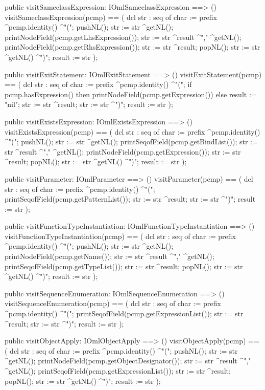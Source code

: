 \begin{vdm_al}
  public visitSameclassExpression: IOmlSameclassExpression ==> ()
  visitSameclassExpression(pcmp) ==
    ( dcl str : seq of char := prefix ^pcmp.identity() ^"(";
      pushNL();
      str := str ^getNL();
      printNodeField(pcmp.getLhsExpression());
      str := str ^result ^"," ^getNL();
      printNodeField(pcmp.getRhsExpression());
      str := str ^result;
      popNL();
      str := str ^getNL() ^")";
      result := str );

  public visitExitStatement: IOmlExitStatement ==> ()
  visitExitStatement(pcmp) ==
    ( dcl str : seq of char := prefix ^pcmp.identity() ^"(";
      if pcmp.hasExpression()
      then printNodeField(pcmp.getExpression())
      else result := "nil";
      str := str ^result;
      str := str ^")";
      result := str );

  public visitExistsExpression: IOmlExistsExpression ==> ()
  visitExistsExpression(pcmp) ==
    ( dcl str : seq of char := prefix ^pcmp.identity() ^"(";
      pushNL();
      str := str ^getNL();
      printSeqofField(pcmp.getBindList());
      str := str ^result ^"," ^getNL();
      printNodeField(pcmp.getExpression());
      str := str ^result;
      popNL();
      str := str ^getNL() ^")";
      result := str );

  public visitParameter: IOmlParameter ==> ()
  visitParameter(pcmp) ==
    ( dcl str : seq of char := prefix ^pcmp.identity() ^"(";
      printSeqofField(pcmp.getPatternList());
      str := str ^result;
      str := str ^")";
      result := str );

  public visitFunctionTypeInstantiation: IOmlFunctionTypeInstantiation ==> ()
  visitFunctionTypeInstantiation(pcmp) ==
    ( dcl str : seq of char := prefix ^pcmp.identity() ^"(";
      pushNL();
      str := str ^getNL();
      printNodeField(pcmp.getName());
      str := str ^result ^"," ^getNL();
      printSeqofField(pcmp.getTypeList());
      str := str ^result;
      popNL();
      str := str ^getNL() ^")";
      result := str );

  public visitSequenceEnumeration: IOmlSequenceEnumeration ==> ()
  visitSequenceEnumeration(pcmp) ==
    ( dcl str : seq of char := prefix ^pcmp.identity() ^"(";
      printSeqofField(pcmp.getExpressionList());
      str := str ^result;
      str := str ^")";
      result := str );

  public visitObjectApply: IOmlObjectApply ==> ()
  visitObjectApply(pcmp) ==
    ( dcl str : seq of char := prefix ^pcmp.identity() ^"(";
      pushNL();
      str := str ^getNL();
      printNodeField(pcmp.getObjectDesignator());
      str := str ^result ^"," ^getNL();
      printSeqofField(pcmp.getExpressionList());
      str := str ^result;
      popNL();
      str := str ^getNL() ^")";
      result := str );


\end{vdm_al}
